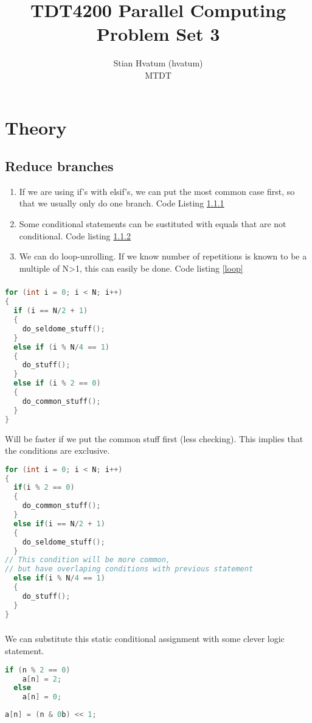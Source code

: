 \documentclass[english,a4paper,numbers=noenddot]{scrartcl}
\title{TDT4200 Parallel Computing\\
\Huge Problem Set 3}
\author{Stian Hvatum (hvatum)\\MTDT}
\begin{document}
\maketitle
\tableofcontents
\newpage
\section{Theory}
\subsection{Reduce branches}
\begin{enumerate}
\item If we are using if's with elsif's, we can put the most common case first, so that we usually only do one branch. Code Listing \ref{common}\hfill
\item Some conditional statements can be sustituted with equals that are not conditional. Code listing \ref{change}\hfill
\item We can do loop-unrolling. If we know number of repetitions is known to be a multiple of N\textgreater 1, this can easily be done. Code listing \ref{loop}\hfill
\end{enumerate}
\subsubsection{}
\label{common}
\begin{lstlisting}[language=C]
for (int i = 0; i < N; i++)
{
  if (i == N/2 + 1)
  {
    do_seldome_stuff();
  }
  else if (i % N/4 == 1)
  {
    do_stuff();
  }
  else if (i % 2 == 0)
  {
    do_common_stuff();
  }
}
\end{lstlisting}
Will be faster if we put the common stuff first (less checking). This implies that the conditions are exclusive.
\begin{lstlisting}[language=C]
for (int i = 0; i < N; i++)
{
  if(i % 2 == 0)
  {
    do_common_stuff();
  }
  else if(i == N/2 + 1)
  {
    do_seldome_stuff();
  }
// This condition will be more common,
// but have overlaping conditions with previous statement
  else if(i % N/4 == 1)
  {
    do_stuff();
  }
}
\end{lstlisting}
\newpage
\subsubsection{}
\label{change}
We can substitute this static conditional assignment with some clever logic statement.
\begin{lstlisting}[language=C]
  if (n % 2 == 0)
    a[n] = 2;
  else
    a[n] = 0;
\end{lstlisting}
\begin{lstlisting}[language=C]
    a[n] = (n & 0b) << 1;
\end{lstlisting}
\end{document}
